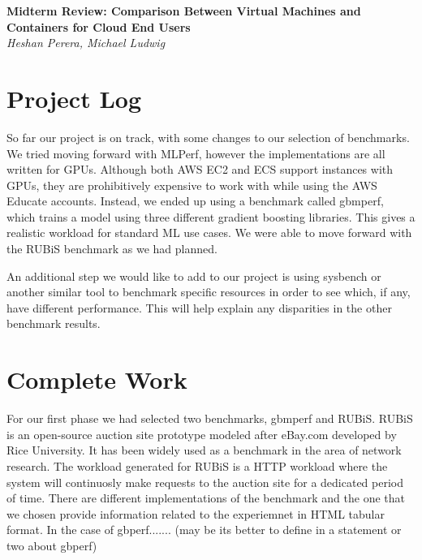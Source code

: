 \documentclass[11pt]{article}
\begin{document}
\renewcommand{\headrulewidth}{0pt} 
\renewcommand{\footrulewidth}{0pt} 
\pagestyle{fancy}
\cfoot{}
\lhead{}
\rhead{}
\lfoot{\itshape\textcolor{gray}{CS525T Cloud Computing Paper Review}}

\begin{center}
{\LARGE \bf Midterm Review: Comparison Between Virtual Machines and Containers for Cloud End Users} \\
{\normalsize \emph{Heshan Perera, Michael Ludwig}}\\

\end{center}

\section{Project Log}

So far our project is on track, with some changes to our selection of benchmarks. We tried moving forward with MLPerf, however the implementations are all written for GPUs. Although both AWS EC2 and ECS support instances with GPUs, they are prohibitively expensive to work with while using the AWS Educate accounts. Instead, we ended up using a benchmark called gbmperf, which trains a model using three different gradient boosting libraries. This gives a realistic workload for standard ML use cases. We were able to move forward with the RUBiS benchmark as we had planned. 

An additional step we would like to add to our project is using sysbench or another similar tool to benchmark specific resources in order to see which, if any, have different performance. This will help explain any disparities in the other benchmark results.

\section{Complete Work}

For our first phase we had selected two benchmarks, gbmperf and RUBiS. RUBiS is an open-source auction site prototype modeled after eBay.com developed by Rice University. It has been widely used as a benchmark in the area of network research. The workload generated for RUBiS is a HTTP workload where the system will continuosly make requests to the auction site for a dedicated period of time. There are different implementations of the benchmark and the one that we chosen provide information related to the experiemnet in HTML tabular format. In the case of gbperf....... (may be its better to define in a statement or two about gbperf) 
\end{document}
